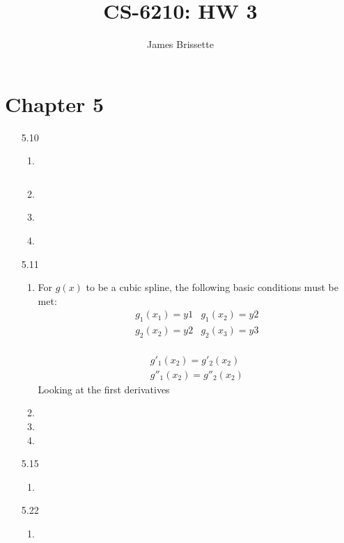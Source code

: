 \documentclass[11pt,a4paper]{article}
\author{James Brissette}
\title{CS-6210: HW 3}
\begin{document}
	\maketitle
	
	\section{Chapter 5}
		\begin{itemize}
			\item[5.10]
				\begin{enumerate} [label={\alph*)}]
					\item ~
					\begin{lstlisting} 
					\end{lstlisting}
					\item ~
					
					\item ~
					\item ~
				\end{enumerate}
					
			\item[5.11]
				\begin{enumerate} [label={\alph*)}]
					\item For $g(x)$ to be a cubic spline, the following basic conditions must be met:
					$$\begin{array}{cc}
						g_1(x_1)=y1 & g_1(x_2)=y2 \\
						g_2(x_2)=y2 & g_2(x_3)=y3 
					\end{array}$$~
					$$\begin{array}{c}
						g'_1(x_2)=g'_2(x_2)\\
						g''_1(x_2)=g''_2(x_2)
					\end{array}$$
					Looking at the first derivatives
					\item
					\item
					\item 
				\end{enumerate}
				
			\item[5.15]
				\begin{enumerate} [label={\alph*)}]
					\item ~
				\end{enumerate}
				
			\item[5.22]
				\begin{enumerate} [label={\alph*)}]
					\item ~
				\end{enumerate}
				

\end{itemize}
\end{document}
